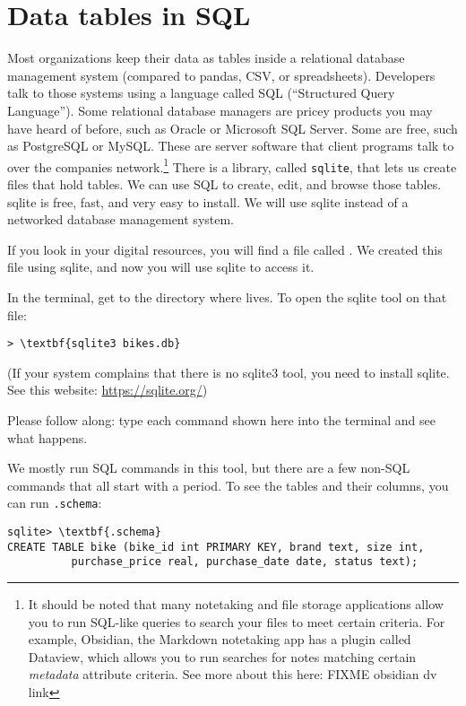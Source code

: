 \chapter{Data tables in SQL}

Most organizations keep their data as tables inside a relational
database management system (compared to pandas, CSV, or spreadsheets). Developers talk to those systems using a
language called SQL (``Structured Query Language'').
Some relational database managers are pricey products you may have
heard of before, such as Oracle or Microsoft SQL Server. Some are free, such as
PostgreSQL or MySQL. These are server software that client programs
talk to over the companies network.\footnote{It should be noted that many notetaking and file storage applications allow you to run SQL-like queries to search your files to meet certain criteria. For example, Obsidian, the Markdown notetaking app has a plugin called Dataview, which allows you to run searches for notes matching certain \emph{metadata} attribute criteria. See more about this here: FIXME obsidian dv link}
There is a library, called \texttt{sqlite}, that lets us create files that hold
tables. We can use SQL to create, edit, and browse those tables.
sqlite is free, fast, and very easy to install. We will use sqlite
instead of a networked database management system.

If you look in your digital resources, you will find a file called
. We created this file using sqlite, and now you
will use sqlite to access it.

In the terminal, get to the directory where  lives. To open the sqlite tool on that file:

\begin{Verbatim}[commandchars=\\\{\}]
> \textbf{sqlite3 bikes.db}
\end{Verbatim}

(If your system complains that there is no sqlite3 tool, you need to install sqlite. See this website: \url{https://sqlite.org/})

Please follow along: type each command shown here into the terminal
and see what happens.

We mostly run SQL commands in this tool, but there are a few non-SQL
 commands that all start with a period. To see the tables and their
 columns, you can run \texttt{.schema}:

\begin{Verbatim}[commandchars=\\\{\}]
sqlite> \textbf{.schema}
CREATE TABLE bike (bike_id int PRIMARY KEY, brand text, size int,
          purchase_price real, purchase_date date, status text);
\end{Verbatim}

